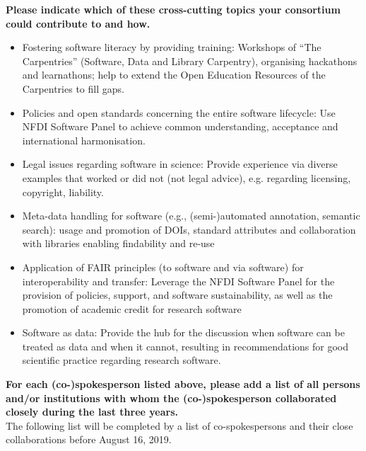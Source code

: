 \documentclass[11pt,a4paper,DIV=11]{scrlttr2}
\begin{document}
\begin{letter}{}
\vspace{1em}
\textbf{Please indicate which of these cross-cutting topics your consortium could contribute to and how.}\\
\begin{itemize}
\item Fostering software literacy by providing training: Workshops of  “The Carpentries” (Software, Data and Library Carpentry), organising hackathons and learnathons; help to extend the Open Education Resources of the Carpentries to fill gaps.
\item Policies and open standards concerning the entire software lifecycle: Use NFDI Software Panel to achieve common understanding, acceptance and international harmonisation.
\item Legal issues regarding software in science: Provide experience via diverse examples that worked or did not (not legal advice), e.g. regarding licensing, copyright, liability.
\item Meta-data handling for software (e.g., (semi-)automated annotation, semantic search): usage and promotion of DOIs, standard attributes and collaboration with libraries enabling findability and re-use
\item Application of FAIR principles (to software and via software) for interoperability and transfer: Leverage the NFDI Software Panel for the provision of policies, support, and software sustainability, as well as the promotion of academic credit for research software
\item Software as data: Provide the hub for the discussion when software can be treated as data and when it cannot, resulting in recommendations for good scientific practice regarding research software.
\end{itemize}

\clearpage
{}

\textbf{For each (co-)spokesperson listed above, please add a list of all persons and/or
institutions with whom the (co-)spokesperson collaborated closely during the last
three years.}\\

The following list will be completed by a list of co-spokespersons and their close
collaborations before August 16, 2019.\\


\end{letter}
\end{document}
